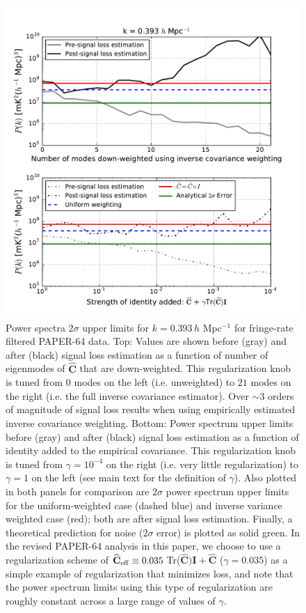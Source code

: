 \documentclass[preprint2,numberedappendix,tighten]{aastex6}
\begin{document}
\begin{figure}
	\centering
	\includegraphics[width=1\textwidth]{plots/sigloss_modeloop_2panel.pdf}
	\caption{Power spectra $2\sigma$ upper limits for $k=0.393$\,$h$ Mpc$^{-1}$ for fringe-rate filtered PAPER-64 data. Top: Values 
are shown before (gray) and after (black) signal loss estimation as a function of number of eigenmodes of $\widehat{\textbf{C}}$ that 
are down-weighted. This regularization knob is tuned from $0$ modes on the left (i.e. unweighted) to $21$ modes on the right (i.e. the full inverse 
covariance estimator). Over $\sim3$ orders of magnitude of signal loss results when using empirically estimated inverse covariance weighting. Bottom: Power spectrum upper limits before (gray) and after (black) signal loss estimation as a function of identity added to the empirical covariance. This regularization knob is tuned from $\gamma = 10^{-4}$ on the right (i.e. very little regularization) to $\gamma = 1$ on the left (see main text for the definition of $\gamma$). Also 
plotted in both panels for comparison are $2\sigma$ power spectrum upper limits for the uniform-weighted case (dashed blue) and inverse variance 
weighted case (red); both are after signal loss estimation. Finally, a theoretical prediction for noise ($2\sigma$ error) is plotted 
as solid green. In the revised PAPER-64 analysis in this paper, we choose to use a regularization scheme of $\widehat{\textbf{C}}_{\rm eff} \equiv 0.035 \, $Tr($\widehat{\textbf{C}})\textbf{I} + \widehat{\textbf{C}}$ ($\gamma = 0.035$) as a simple example of regularization that minimizes loss, and note that the power spectrum limits using this type of regularization are roughly constant across a large range of values of $\gamma$.}
	\label{fig:sigloss_modeloop}
\end{figure}
\end{document}
